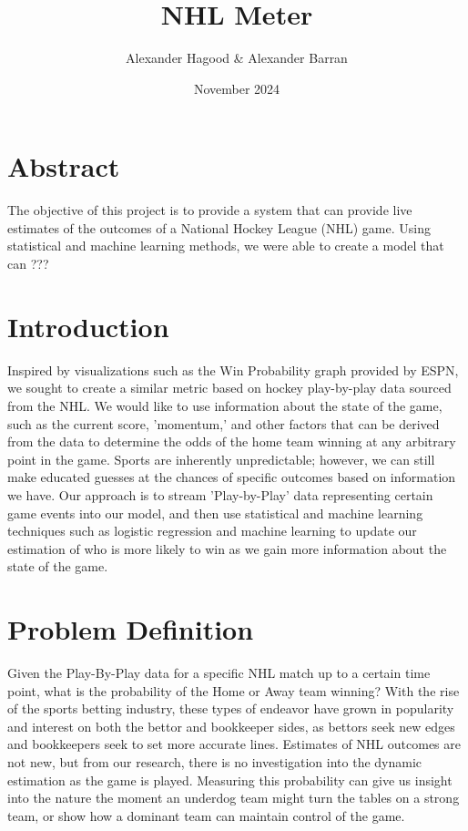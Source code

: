 \documentclass{article}
\title{NHL Meter}
\author{Alexander Hagood \& Alexander Barran}
\date{November 2024}
\begin{document}
\maketitle

\section{Abstract}
The objective of this project is to provide a system that can provide live estimates of the outcomes of a National Hockey League (NHL) game.
Using statistical and machine learning methods, we were able to create a model that can ???

\section{Introduction}
Inspired by visualizations such as the Win Probability graph provided by ESPN, we sought to create a similar metric based on hockey play-by-play data sourced from the NHL.
We would like to use information about the state of the game, such as the current score, 'momentum,' and other factors that can be derived from the data to determine the odds of the home team winning at any arbitrary point in the game.
Sports are inherently unpredictable; however, we can still make educated guesses at the chances of specific outcomes based on information we have.
Our approach is to stream 'Play-by-Play' data representing certain game events into our model, and then use statistical and machine learning techniques such as logistic regression and machine learning to update our estimation of who is more likely to win as we gain more information about the state of the game.


\section{Problem Definition}
Given the Play-By-Play data for a specific NHL match up to a certain time point, 
what is the probability of the Home or Away team winning? With the rise of the sports
betting industry, these types of endeavor have grown in popularity and interest on
both the bettor and bookkeeper sides, as bettors seek new edges and bookkeepers seek
to set more accurate lines. Estimates of NHL outcomes are not new, but from our research,
there is no investigation into the dynamic estimation as the game is played. Measuring
this probability can give us insight into the nature the moment an underdog team might
turn the tables on a strong team, or show how a dominant team can maintain control of the game.
\end{document}
